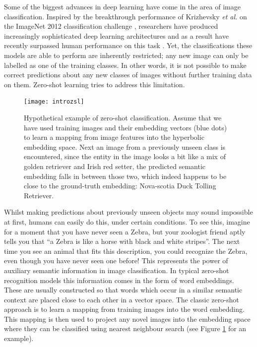 \documentclass[12pt]{report}
\begin{document}
Some of the biggest advances in deep learning have come in the area of image classification. Inspired by the breakthrough performance of Krizhevsky \textit{et al.} \cite{Krizhevsky2012} on the ImageNet 2012 classification challenge \cite{JiaDeng2009}, researchers have produced increasingly sophisticated deep learning architectures and as a result have recently surpassed human performance on this task \cite{Dodge2017}. Yet, the classifications these models are able to perform are inherently restricted; any new image can only be labelled as one of the training classes. In other words, it is not possible to make correct predictions about any new classes of images without further training data on them. Zero-shot learning \cite{Palatucci2009} tries to address this limitation.

\begin{figure}
  \centering
	\texttt{[image: introzsl]}
	\caption{Hypothetical example of zero-shot classification. Assume that we have used training images and their embedding vectors (blue dots) to learn a mapping from image features into the hyperbolic embedding space. Next an image from a previously unseen class is encountered, since the entity in the image looks a bit like a mix of golden retriever and Irish red setter, the predicted semantic embedding falls in between those two, which indeed happens to be close to the ground-truth embedding: Nova-scotia Duck Tolling Retriever.}
	\label{fig:intro}
\end{figure}

Whilst making predictions about previously unseen objects may sound impossible at first, humans can easily do this, under certain conditions. To see this, imagine for a moment that you have never seen a Zebra, but your zoologist friend aptly tells you that ``a Zebra is like a horse with black and white stripes''. The next time you see an animal that fits this description, you could recognize the Zebra, even though you have never seen one before! This represents the power of auxiliary semantic information in image classification. In typical zero-shot recognition models this information comes in the form of word embeddings. These are usually constructed so that words which occur in a similar semantic context are placed close to each other in a vector space. The classic zero-shot approach is to learn a mapping from training images into the word embedding. This mapping is then used to project any novel images into the embedding space where they can be classified using nearest neighbour search (see Figure \ref{fig:intro} for an example). 
\end{document}
